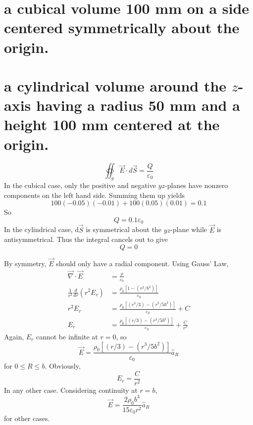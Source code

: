 \documentclass[answers]{exam}
\begin{document}
\begin{questions}
\begin{parts}
	\part{a cubical volume 100 mm on a side centered symmetrically about the origin.}
	\part{a cylindrical volume around the $z$-axis having a radius 50 mm and a height 100 mm centered at the origin.}
\end{parts}

\begin{solution}
	$$\oiint_S \vec{E}\cdot d\vec{S} = \frac{Q}{\varepsilon_0}$$
	In the cubical case, only the positive and negative $yz$-planes have nonzero components on the left hand side. Summing them up yields
	$$100(-0.05)(-0.01) + 100(0.05)(0.01) = 0.1$$
	So
	$$Q=0.1\varepsilon_0$$
	In the cylindrical case, d$\vec{S}$ is symmetrical about the $yz$-plane while $\vec{E}$ is antisymmetrical. Thus the integral cancels out to give
	$$Q=0$$
\end{solution}


\begin{solution}
	By symmetry, $\vec{E}$ should only have a radial component. Using Gauss' Law,
	\begin{align*}
		\vec{\nabla}\cdot\vec{E} &= \frac{\rho}{\varepsilon_0} \\
		\frac{1}{r^2}\frac{d}{dr}\left(r^2E_r\right) &= \frac{\rho_0[1-(r^2/b^2)]}{\varepsilon_0} \\
		r^2E_r &= \frac{\rho_0[(r^3/3)-(r^5/5b^2)]}{\varepsilon_0} + C \\
		E_r &= \frac{\rho_0[(r/3)-(r^3/5b^2)]}{\varepsilon_0} + \frac{C}{r^2}
	\end{align*}
	Again, $E_r$ cannot be infinite at $r=0$, so
	$$\vec{E} = \frac{\rho_0[(r/3)-(r^3/5b^2)]}{\varepsilon_0}\hat{a}_R$$
	for $0\leq R\leq b$. Obviously,
	$$E_r = \frac{C}{r^2}$$
	In any other case. Considering continuity at $r=b$,
	$$\vec{E} = \frac{2\rho_0b^3}{15\varepsilon_0r^2}\hat{a}_R$$
	for other cases.
\end{solution}



\end{questions}
\end{document}
